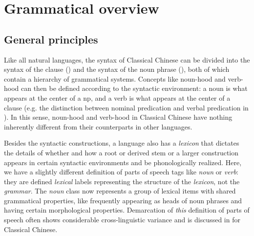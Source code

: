 \documentclass[UTF8, a4paper, oneside, scheme=plain, 12pt]{ctexrep}
\newcommand*{\term}[1]{\emph{#1}}
\begin{document}
\chapter{Grammatical overview}

\section{General principles}\label{sec:grammatical.intro}

Like all natural languages, the syntax of Classical Chinese can be divided into 
the syntax of the clause () and the syntax of the noun phrase (),
both of which contain a hierarchy of grammatical systems.
Concepts like noun-hood and verb-hood can then be defined according to the syntactic environment:
a noun is what appears at the center of a \ac{np},
and a verb is what appears at the center of a clause
(e.g. the distinction between nominal predication and verbal predication 
in ).
In this sense, noun-hood and verb-hood in Classical Chinese have nothing inherently different from their counterparts in other languages.

Besides the syntactic constructions, 
a language also has a \emph{lexicon} that dictates 
the details of whether and how a root or derived stem or a larger construction appears
in certain syntactic environments and be phonologically realized.
Here, we have a slightly different definition of 
parts of speech tags like \term{noun} or \term{verb}:
they are defined \emph{lexical} labels 
representing the structure of the \emph{lexicon}, not the \emph{grammar}.
The \term{noun} class now represents a group of lexical items with shared grammatical properties,
like frequently appearing as heads of noun phrases and having certain morphological properties.
Demarcation of \emph{this} definition of parts of speech often shows considerable cross-linguistic variance and is discussed in  for Classical Chinese.
\end{document}
